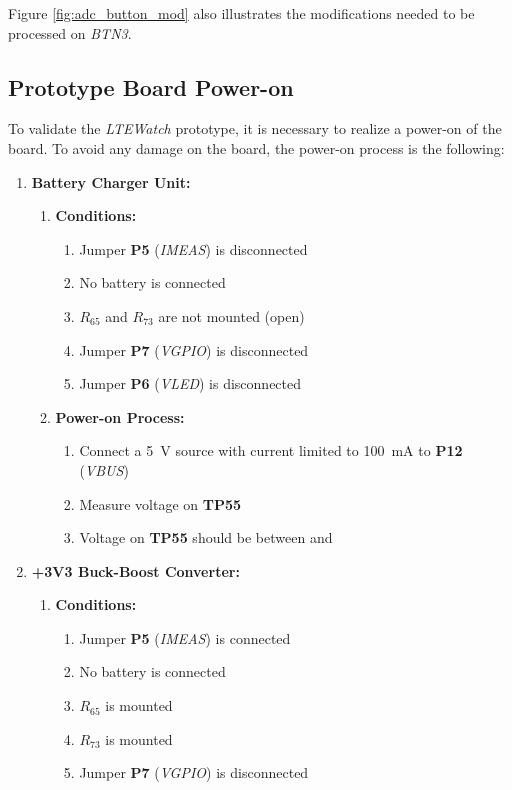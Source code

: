 \documentclass[Report.tex]{subfiles}
\begin{document}
Figure \ref{fig:adc_button_mod} also illustrates the modifications needed to be processed on \textit{BTN3}.

\subsection{Prototype Board Power-on}
To validate the \textit{LTEWatch} prototype, it is necessary to realize a power-on of the board. To avoid any damage on the board, the power-on process is the following:

\begin{enumerate}
\item \textbf{Battery Charger Unit:}
\begin{enumerate}
\item \textbf{Conditions:}
\begin{enumerate}
\item Jumper \textbf{P5} (\textit{IMEAS}) is disconnected
\item No battery is connected 
\item $R_{65}$ and $R_{73}$ are not mounted (open)
\item Jumper \textbf{P7} (\textit{VGPIO}) is disconnected
\item Jumper \textbf{P6} (\textit{VLED}) is disconnected
\end{enumerate}
\item \textbf{Power-on Process:}
\begin{enumerate}
\item Connect a \SI{5}{\volt} source with current limited to \SI{100}{\milli\ampere} to \textbf{P12} (\textit{VBUS})
\item Measure voltage on \textbf{TP55}
\item Voltage on \textbf{TP55} should be between  and 
\end{enumerate}
\end{enumerate}
\item \textbf{+3V3 Buck-Boost Converter:}
\begin{enumerate}
\item \textbf{Conditions:}
\begin{enumerate}
\item Jumper \textbf{P5} (\textit{IMEAS}) is connected
\item No battery is connected 
\item $R_{65}$ is mounted
\item $R_{73}$ is mounted
\item Jumper \textbf{P7} (\textit{VGPIO}) is disconnected

\end{enumerate}
\end{enumerate}
\end{enumerate}
\end{document}
